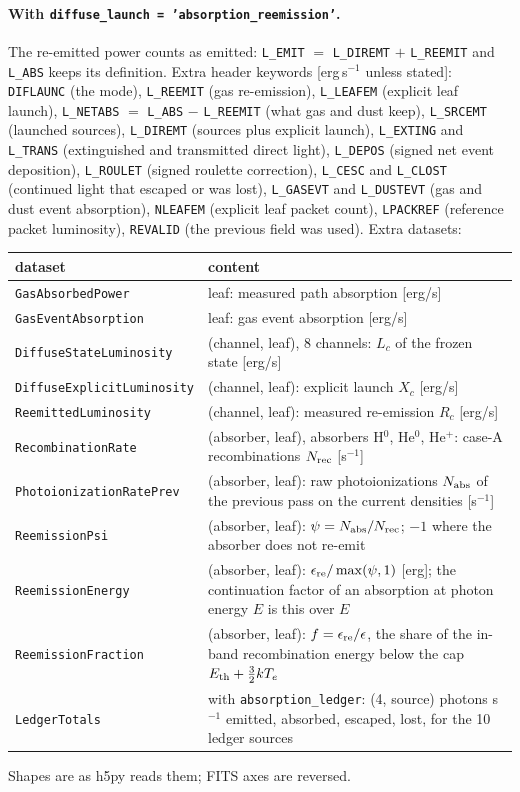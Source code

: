 \documentclass[english,a4paper]{my_memo}
\newcommand{\code}[1]{\texttt{#1}}
\begin{document}
\paragraph{With \code{diffuse\_launch = 'absorption\_reemission'}.}  The
re-emitted power counts as emitted: \code{L\_EMIT} $=$ \code{L\_DIREMT} $+$
\code{L\_REEMIT} and \code{L\_ABS} keeps its definition.  Extra header
keywords [erg\,s$^{-1}$ unless stated]: \code{DIFLAUNC} (the mode),
\code{L\_REEMIT} (gas re-emission), \code{L\_LEAFEM} (explicit leaf launch),
\code{L\_NETABS} $=$ \code{L\_ABS} $-$ \code{L\_REEMIT} (what gas and dust
keep), \code{L\_SRCEMT} (launched sources), \code{L\_DIREMT} (sources plus
explicit launch), \code{L\_EXTING} and \code{L\_TRANS} (extinguished and
transmitted direct light), \code{L\_DEPOS} (signed net event deposition),
\code{L\_ROULET} (signed roulette correction), \code{L\_CESC} and
\code{L\_CLOST} (continued light that escaped or was lost), \code{L\_GASEVT}
and \code{L\_DUSTEVT} (gas and dust event absorption), \code{NLEAFEM}
(explicit leaf packet count), \code{LPACKREF} (reference packet luminosity),
\code{REVALID} (the previous field was used).  Extra datasets:
\begin{center}\small
\begin{tabular}{lp{9.5cm}}
\toprule
dataset & content \\
\midrule
\code{GasAbsorbedPower} & leaf: measured path absorption [erg/s] \\
\code{GasEventAbsorption} & leaf: gas event absorption [erg/s] \\
\code{DiffuseStateLuminosity} & (channel, leaf), 8 channels: $L_c$ of the
frozen state [erg/s] \\
\code{DiffuseExplicitLuminosity} & (channel, leaf): explicit launch $X_c$
[erg/s] \\
\code{ReemittedLuminosity} & (channel, leaf): measured re-emission $R_c$
[erg/s] \\
\code{RecombinationRate} & (absorber, leaf), absorbers H$^0$, He$^0$,
He$^+$: case-A recombinations $N_{\rm rec}$ [s$^{-1}$] \\
\code{PhotoionizationRatePrev} & (absorber, leaf): raw photoionizations
$N_{\rm abs}$ of the previous pass on the current densities [s$^{-1}$] \\
\code{ReemissionPsi} & (absorber, leaf): $\psi=N_{\rm abs}/N_{\rm rec}$;
$-1$ where the absorber does not re-emit \\
\code{ReemissionEnergy} & (absorber, leaf): $\epsilon_{\rm re}/\max(\psi,1)$
[erg]; the continuation factor of an absorption at photon energy $E$ is
this over $E$ \\
\code{ReemissionFraction} & (absorber, leaf): $f=\epsilon_{\rm
re}/\epsilon$, the share of the in-band recombination energy below the cap
$E_{\rm th}+\frac32kT_e$ \\
\code{LedgerTotals} & with \code{absorption\_ledger}: (4, source) photons
s$^{-1}$ emitted, absorbed, escaped, lost, for the 10 ledger sources \\
\bottomrule
\end{tabular}
\end{center}
Shapes are as h5py reads them; FITS axes are reversed.
\end{document}
